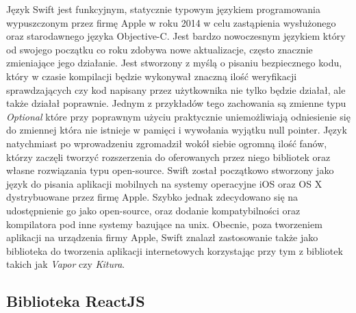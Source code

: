 Język Swift jest funkcyjnym, statycznie typowym językiem programowania wypuszczonym przez firmę Apple w roku 2014 w celu zastąpienia wysłużonego oraz starodawnego języka Objective-C. Jest bardzo nowoczesnym językiem który od swojego początku co roku zdobywa nowe aktualizacje, często znacznie zmieniające jego działanie. Jest stworzony z myślą o pisaniu bezpiecznego kodu, który w czasie kompilacji będzie wykonywał znaczną ilość weryfikacji sprawdzających czy kod napisany przez użytkownika nie tylko będzie działał, ale także działał poprawnie. Jednym z przykładów tego zachowania są zmienne typu \textit{Optional} które przy poprawnym użyciu praktycznie uniemożliwiają odniesienie się do zmiennej która nie istnieje w pamięci i wywołania wyjątku null pointer. Język natychmiast po wprowadzeniu zgromadził wokół siebie ogromną ilość fanów, którzy zaczęli tworzyć rozszerzenia do oferowanych przez niego bibliotek oraz własne rozwiązania typu open-source.\newline
Swift został początkowo stworzony jako język do pisania aplikacji mobilnych na systemy operacyjne iOS oraz OS X dystrybuowane przez firmę Apple. Szybko jednak zdecydowano się na udostępnienie go jako open-source, oraz dodanie kompatybilności oraz kompilatora pod inne systemy bazujące na unix. Obecnie, poza tworzeniem aplikacji na urządzenia firmy Apple, Swift znalazł zastosowanie także jako biblioteka do tworzenia aplikacji internetowych korzystając przy tym z bibliotek takich jak \textit{Vapor} czy \textit{Kitura}.

\subsection{Biblioteka ReactJS}

